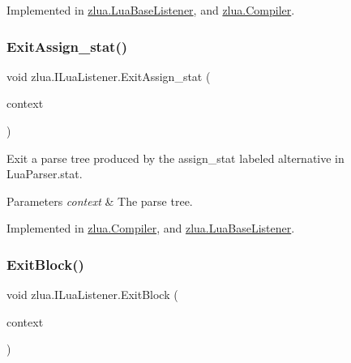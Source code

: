 Implemented in \mbox{\hyperlink{classzlua_1_1_lua_base_listener_aee2d21cae37901e87685fc50c87f8f1f}{zlua.\+Lua\+Base\+Listener}}, and \mbox{\hyperlink{classzlua_1_1_compiler_ae35672ab6cc512e4dab4ddc9063d9f22}{zlua.\+Compiler}}.

\mbox{\label{interfacezlua_1_1_i_lua_listener_ad3a0df056fe6b0c23d11cad89f6091c7}} 
\subsubsection{\texorpdfstring{Exit\+Assign\+\_\+stat()}{ExitAssign\_stat()}}
{\footnotesize\ttfamily void zlua.\+I\+Lua\+Listener.\+Exit\+Assign\+\_\+stat (\begin{DoxyParamCaption}\item[{\mbox{[}\+Not\+Null\mbox{]} \mbox{\hyperlink{classzlua_1_1_lua_parser_1_1_assign__stat_context}{Lua\+Parser.\+Assign\+\_\+stat\+Context}}}]{context }\end{DoxyParamCaption})}



Exit a parse tree produced by the {\ttfamily assign\+\_\+stat} labeled alternative in Lua\+Parser.\+stat. 


\begin{DoxyParams}{Parameters}
{\em context} & The parse tree.\\
\hline
\end{DoxyParams}


Implemented in \mbox{\hyperlink{classzlua_1_1_compiler_a122e9a6b8770d627e6461baee20fcf62}{zlua.\+Compiler}}, and \mbox{\hyperlink{classzlua_1_1_lua_base_listener_a84ee6c5b5c661dee72a99902d27ee46e}{zlua.\+Lua\+Base\+Listener}}.

\mbox{\label{interfacezlua_1_1_i_lua_listener_aa934019f5871ef882e345518906753b7}} 
\subsubsection{\texorpdfstring{Exit\+Block()}{ExitBlock()}}
{\footnotesize\ttfamily void zlua.\+I\+Lua\+Listener.\+Exit\+Block (\begin{DoxyParamCaption}\item[{\mbox{[}\+Not\+Null\mbox{]} \mbox{\hyperlink{classzlua_1_1_lua_parser_1_1_block_context}{Lua\+Parser.\+Block\+Context}}}]{context }\end{DoxyParamCaption})}



